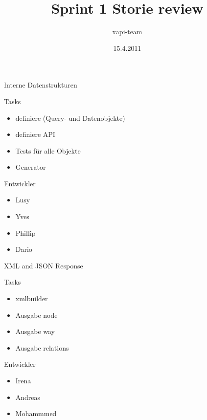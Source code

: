 \documentclass{beamer}
\title{Sprint 1 Storie review}
\author{xapi-team}
\institute{Institute for Computer Science, Free University Berlin}
\date{15.4.2011}
\begin{document}
\begin{frame}
\titlepage
\end{frame}

\begin{frame}{Interne Datenstrukturen}
    
    \begin{block}{Tasks}
        \begin{itemize}
        \item definiere (Query- und Datenobjekte)
        \item definiere API
        \item Tests für alle Objekte
        \item Generator
        \end{itemize}
    \end{block}
    \begin{block}{Entwickler}
        \begin{itemize}
        \item Lusy
        \item Yves
        \item Phillip
        \item Dario
        \end{itemize}
    \end{block}

\end{frame}

\begin{frame}{XML and JSON Response}
    \begin{block}{Tasks}
        \begin{itemize}
        \item xmlbuilder
        \item Ausgabe node
        \item Ausgabe way
        \item Ausgabe relations
        \end{itemize}
    \end{block}
    \begin{block}{Entwickler}
        \begin{itemize}
        \item Irena
        \item Andreas
        \item Mohammmed
        \end{itemize}
    \end{block}

\end{frame}
\end{document}
